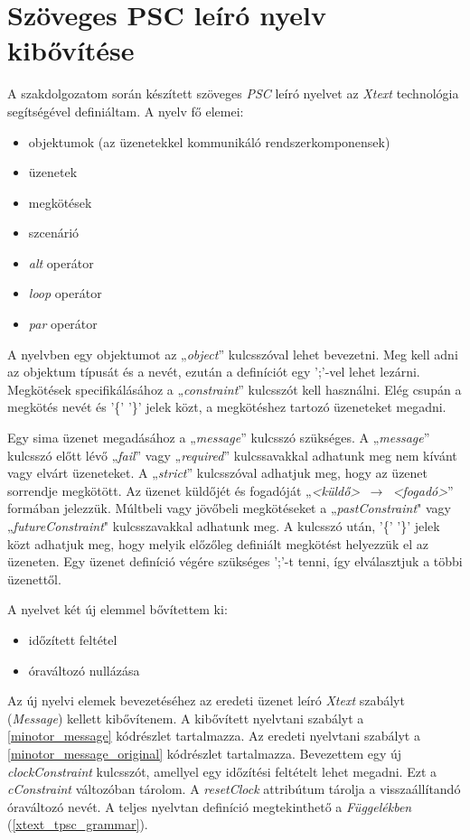 \chapter{Szöveges PSC leíró nyelv kibővítése}

A szakdolgozatom során készített szöveges \textit{PSC} leíró nyelvet \cite{Bakai} az \textit{Xtext} technológia segítségével definiáltam.
A nyelv fő elemei:
\begin{itemize}
    \item objektumok (az üzenetekkel kommunikáló rendszerkomponensek)
    \item üzenetek
    \item megkötések
    \item szcenárió
    \item \textit{alt} operátor
    \item \textit{loop} operátor
    \item \textit{par} operátor
\end{itemize}

A nyelvben egy objektumot az „\textit{object}” kulcsszóval lehet bevezetni.
Meg kell adni az objektum típusát és a nevét, ezután a definíciót egy ’;’-vel lehet lezárni.
Megkötések specifikálásához a „\textit{constraint}” kulcsszót kell használni.
Elég csupán a megkötés nevét és '\{' '\}' jelek közt, a megkötéshez tartozó üzeneteket megadni.

Egy sima üzenet megadásához a „\textit{message}” kulcsszó szükséges.
A „\textit{message}” kulcsszó előtt lévő „\textit{fail}” vagy „\textit{required}” kulcssavakkal adhatunk meg nem kívánt vagy elvárt üzeneteket.
A „\textit{strict}” kulcsszóval adhatjuk meg, hogy az üzenet sorrendje megkötött.
Az üzenet küldőjét és fogadóját „\textit{<küldő> $\,\to\,$ <fogadó>}” formában jelezzük.
Múltbeli vagy jövőbeli megkötéseket a „\textit{pastConstraint}" vagy „\textit{futureConstraint}" kulcsszavakkal adhatunk meg.
A kulcsszó után, '\{' '\}' jelek közt adhatjuk meg, hogy melyik előzőleg definiált megkötést helyezzük el az üzeneten.
Egy üzenet definíció végére szükséges ’;’-t tenni, így elválasztjuk a többi üzenettől.

A nyelvet két új elemmel bővítettem ki:
\begin{itemize}
    \item időzített feltétel
    \item óraváltozó nullázása
\end{itemize}
Az új nyelvi elemek bevezetéséhez az eredeti üzenet leíró \textit{Xtext} szabályt (\textit{Message}) kellett kibővítenem.
A kibővített nyelvtani szabályt a \ref{minotor_message} kódrészlet tartalmazza.
Az eredeti nyelvtani szabályt a \ref{minotor_message_original} kódrészlet tartalmazza.
Bevezettem egy új \textit{clockConstraint} kulcsszót, amellyel egy időzítési feltételt lehet megadni.
Ezt a \textit{cConstraint} változóban tárolom.
A \textit{resetClock} attribútum tárolja a visszaállítandó óraváltozó nevét.
A teljes nyelvtan definíció megtekinthető a \textit{Függelékben} (\ref{xtext_tpsc_grammar}).

